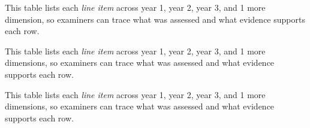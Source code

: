 \begin{table}[!htbp]
\centering\tablestripes\tablefontsize
{\small
{}

\noindent This table lists each \textit{line item} across year 1, year 2, year 3, and 1 more dimension, so examiners can trace what was assessed and what evidence supports each row.



\noindent This table lists each \textit{line item} across year 1, year 2, year 3, and 1 more dimensions, so examiners can trace what was assessed and what evidence supports each row.


\noindent This table lists each \textit{line item} across year 1, year 2, year 3, and 1 more dimensions, so examiners can trace what was assessed and what evidence supports each row.



}
\end{table}
